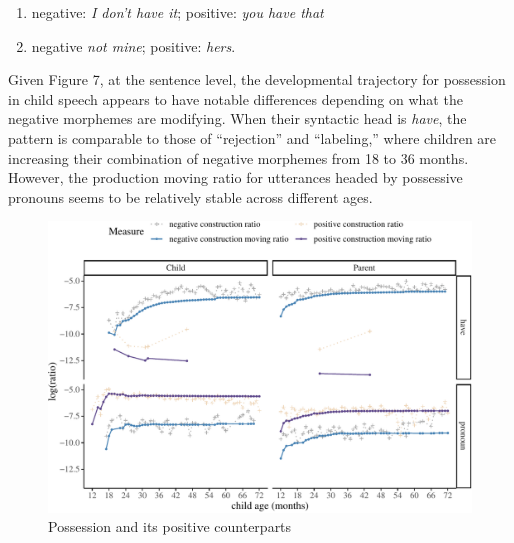 \documentclass[
  english,
  man,floatsintext]{apa6}
\providecommand{\tightlist}{%
  \setlength{\itemsep}{0pt}\setlength{\parskip}{0pt}}
\begin{document}
\begin{enumerate}
\def\labelenumi{(\arabic{enumi})}
\setcounter{enumi}{14}
\tightlist
\item
  negative: \emph{I don't have it}; positive: \emph{you have that}
\item
  negative \emph{not mine}; positive: \emph{hers}.
\end{enumerate}

Given Figure 7, at the sentence level, the developmental trajectory for possession in child speech appears to have notable differences depending on what the negative morphemes are modifying. When their syntactic head is \emph{have}, the pattern is comparable to those of ``rejection'' and ``labeling,'' where children are increasing their combination of negative morphemes from 18 to 36 months. However, the production moving ratio for utterances headed by possessive pronouns seems to be relatively stable across different ages.

\begin{figure}[H]

{\centering \includegraphics{neg_construction_article_files/figure-latex/possession-1} 

}

\caption{Possession and its positive counterparts}\label{fig:possession}
\end{figure}
\end{document}
